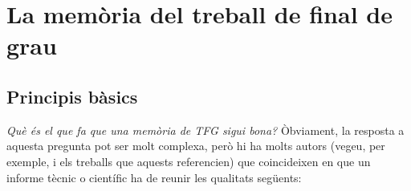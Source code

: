 
\chapter[més curt]{La memòria del treball de final de grau}\label{memoria}

\section{Principis bàsics}

\emph{Què és el que fa que una memòria de \ac{TFG} sigui bona?} Òbviament, la resposta a aquesta pregunta pot ser molt complexa, però hi ha molts autors (vegeu, per exemple, \cite{Perelman01,Malvar08} i els treballs que aquests referencien) que coincideixen en que un informe tècnic o científic ha de reunir les qualitats següents:
